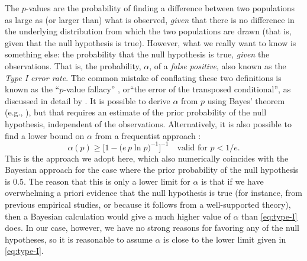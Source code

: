 The \(p\)-values are the probability of finding a difference between
two populations as large as (or larger than) what is observed,
\emph{given} that there is no difference in the underlying
distribution from which the two populations are drawn (that is, given
that the null hypothesis is true).  However, what we really want to
know is something else: the probability that the null hypothesis is
true, \emph{given} the observations.  That is, the probability,
\(\alpha\), of a \textit{false positive}, also known as the \textit{Type I
  error rate}.  The common mistake of conflating these two definitions
is known as the ``\(p\)-value fallacy'' \citep{Goodman:1999a}, or``the
error of the transposed conditional'', as discussed in detail by
\citet{Colquhoun:2014a}.  It is possible to derive \(\alpha\) from
\(p\) using Bayes' theorem (e.g., \citealp{Goodman:1999b}), but that
requires an estimate of the prior probability of the null hypothesis,
independent of the observations.  Alternatively, it is also possible
to find a lower bound on \(\alpha\) from a frequentist approach
\citep{Sellke:2001a}:
\begin{equation}
  \label{eq:type-I}
  \alpha(p) \ge \bigg[ 1 - \big(e\, p \ln p\big)^{-1} \bigg]^{-1}
  \quad \text{valid for } p < 1/e.
\end{equation}
This is the approach we adopt here, which also numerically coincides
with the Bayesian approach for the case where the prior probability of
the null hypothesis is 0.5.  The reason that this is only a lower
limit for \(\alpha\) is that if we have overwhelming a priori evidence that
the null hypothesis is true (for instance, from previous empirical
studies, or because it follows from a well-supported theory), then a
Bayesian calculation would give a much higher value of \(\alpha\) than
\eqref{eq:type-I} does.  In our case, however, we have no strong
reasons for favoring any of the null hypotheses, so it is reasonable
to assume \(\alpha\) is close to the lower limit given in \eqref{eq:type-I}.

